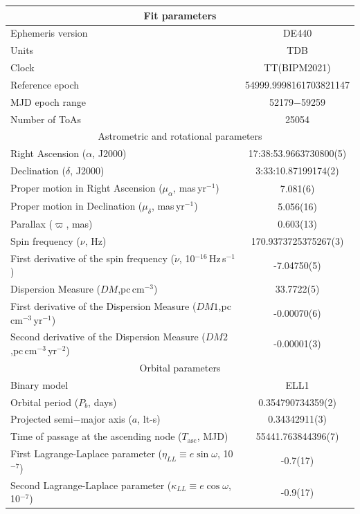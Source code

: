 \documentclass[
    floats,
    floatfix,
    amssymb,
    prd,
    twocolumn,
    superscriptaddress,
    nofootinbib,
    unicode,
    colorlinks=true,
    linktocpage=true
]{revtex4-2}
\begin{document}
\begin{table}[t]
\centering
\begin{tabular}{lc}
\hline
\hline
\multicolumn{2}{c}{Fit parameters} \\
\hline
Ephemeris version & DE440 \\
Units & TDB \\
Clock & TT(BIPM2021) \\
Reference epoch & 54999.9998161703821147 \\
MJD epoch range & 52179$-$59259 \\
Number of ToAs & 25054 \\
\hline
\multicolumn{2}{c}{Astrometric and rotational parameters} \\
\hline
Right Ascension ($\alpha$, J2000) & 17:38:53.9663730800(5) \\
Declination ($\delta$, J2000) & 3:33:10.87199174(2) \\
Proper motion in Right Ascension ($\mu_\alpha $, mas\,yr$^{-1}$) & 7.081(6) \\
Proper motion in Declination ($\mu_\delta $, mas\,yr$^{-1}$) & 5.056(16) \\
Parallax ($\varpi$, mas) & 0.603(13) \\
Spin frequency ($\nu$, Hz) & 170.9373725375267(3) \\
First derivative of the spin frequency ($\dot{\nu}$, 10$^{-16}$\,Hz\,s$^{-1}$) & -7.04750(5) \\
Dispersion Measure ($DM$,pc\,cm$^{-3}$) & 33.7722(5) \\
First derivative of the Dispersion Measure ($DM1$,pc\,cm$^{-3}$\,yr$^{-1}$) & -0.00070(6) \\
Second derivative of the Dispersion Measure ($DM2$,pc\,cm$^{-3}$\,yr$^{-2}$) & -0.00001(3) \\
\hline
\multicolumn{2}{c}{Orbital parameters} \\
\hline
Binary model & ELL1 \\
Orbital period ($P_b$, days) & 0.354790734359(2) \\
Projected semi$-$major axis ($a$, lt-s) & 0.34342911(3) \\
Time of passage at the ascending node ($T_\mathrm{asc}$, MJD) & 55441.763844396(7) \\
First Lagrange-Laplace parameter ($\eta_{LL}\equiv e\sin\omega$, 10$^{-7}$) & -0.7(17) \\
Second Lagrange-Laplace parameter ($\kappa_{LL}\equiv e\cos\omega$, 10$^{-7}$) & -0.9(17) \\

\end{tabular}
\end{table}
\end{document}
